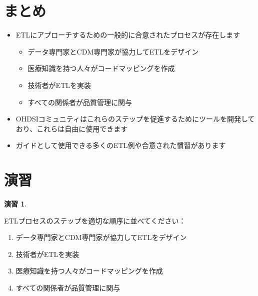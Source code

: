 \documentclass[
  11pt]{book}
\makeatletter
\providecommand{\tightlist}{%
  \setlength{\itemsep}{0pt}\setlength{\parskip}{0pt}}
\newenvironment{kframe}{%
\medskip{}
\setlength{\fboxsep}{.8em}
 \def\at@end@of@kframe{}%
 \ifinner\ifhmode%
  \def\at@end@of@kframe{\end{minipage}}%
  \begin{minipage}{\columnwidth}%
 \fi\fi%
 \def\FrameCommand##1{\hskip\@totalleftmargin \hskip-\fboxsep
 \colorbox{myShadeColor}{##1}\hskip-\fboxsep
     \hskip-\linewidth \hskip-\@totalleftmargin \hskip\columnwidth}%
 \MakeFramed {\advance\hsize-\width
   \@totalleftmargin\z@ \linewidth\hsize
   \@setminipage}}%
 {\par\unskip\endMakeFramed%
 \at@end@of@kframe}
\newenvironment{rmdblock}[1]
  {
  \begin{itemize}
  \renewcommand{\labelitemi}{
    \raisebox{-.7\height}[0pt][0pt]{
      {\setkeys{Gin}{width=3em,keepaspectratio}\texttt{[image: images/\#1]}}
    }
  }
  \setlength{\fboxsep}{1em}
  \begin{kframe}
  \item
  }
  {
  \end{kframe}
  \end{itemize}
  }
\newenvironment{rmdsummary}
  {\begin{rmdblock}{summary}}
  {\end{rmdblock}}
\theoremstyle{definition}
\theoremstyle{definition}
\theoremstyle{definition}
\newtheorem{exercise}{演習}[chapter]
\theoremstyle{definition}
\theoremstyle{remark}
\makeatother
\begin{document}
\section{まとめ}\label{ux307eux3068ux3081-4}

\begin{rmdsummary}
\begin{itemize}
\item
  ETLにアプローチするための一般的に合意されたプロセスが存在します

  \begin{itemize}
  \tightlist
  \item
    データ専門家とCDM専門家が協力してETLをデザイン
  \item
    医療知識を持つ人々がコードマッピングを作成
  \item
    技術者がETLを実装
  \item
    すべての関係者が品質管理に関与
  \end{itemize}
\item
  OHDSIコミュニティはこれらのステップを促進するためにツールを開発しており、これらは自由に使用できます
\item
  ガイドとして使用できる多くのETL例や合意された慣習があります
\end{itemize}
\end{rmdsummary}

\section{演習}\label{ux6f14ux7fd2-2}

\begin{exercise}
\protect\hypertarget{exr:exerciseEtl1}{}\label{exr:exerciseEtl1}

ETLプロセスのステップを適切な順序に並べてください：

\begin{enumerate}
\def\labelenumi{\Alph{enumi})}
\tightlist
\item
  データ専門家とCDM専門家が協力してETLをデザイン
\item
  技術者がETLを実装
\item
  医療知識を持つ人々がコードマッピングを作成
\item
  すべての関係者が品質管理に関与
\end{enumerate}

\end{exercise}
\end{document}
